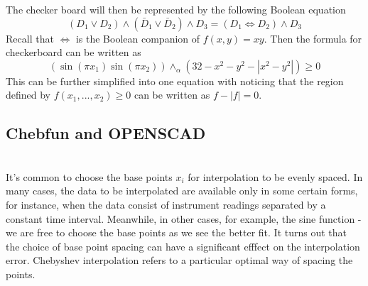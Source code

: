 \documentclass[11pt]{amsart}
\theoremstyle{definition}
\begin{document}
The checker board will then be represented by the following Boolean equation
$$(D_1\vee D_2)\wedge (\bar{D}_1\vee \bar{D}_2)\wedge D_3=(D_1\Leftrightarrow D_2)\wedge D_3$$
Recall that $\Leftrightarrow$ is the Boolean companion of $f(x,y)=xy$. Then the formula for checkerboard can be written as 
$$(\sin(\pi x_1)\sin(\pi x_2)) \wedge_\alpha (32-x^2-y^2-|x^2-y^2|) \geq 0$$
This can be further simplified into one equation with noticing that the region defined by $f(x_1,...,x_2)\geq 0$ can be written as $f-|f|= 0$.  


\subsection{Chebfun and OPENSCAD}~\\
It's common to choose the base points $x_i$ for interpolation to be evenly spaced. In many cases, the data to be interpolated are available only in some certain forms, for instance, when the data consist of instrument readings separated by a constant time interval. Meanwhile, in other cases, for example, the sine function - we are free to choose the base points as we see the better fit. It turns out that the choice of base point spacing can have a significant efffect on the interpolation error. Chebyshev interpolation refers to a particular optimal way of spacing the points.\\ 
\end{document}

